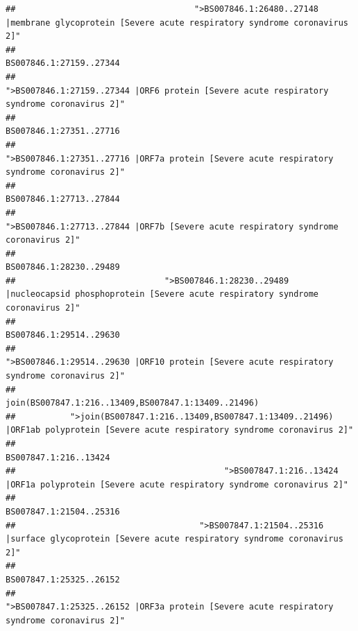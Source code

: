 \documentclass[
]{article}
\begin{document}
\begin{verbatim}
##                                    ">BS007846.1:26480..27148 |membrane glycoprotein [Severe acute respiratory syndrome coronavirus 2]" 
##                                                                                                                BS007846.1:27159..27344 
##                                             ">BS007846.1:27159..27344 |ORF6 protein [Severe acute respiratory syndrome coronavirus 2]" 
##                                                                                                                BS007846.1:27351..27716 
##                                            ">BS007846.1:27351..27716 |ORF7a protein [Severe acute respiratory syndrome coronavirus 2]" 
##                                                                                                                BS007846.1:27713..27844 
##                                                    ">BS007846.1:27713..27844 |ORF7b [Severe acute respiratory syndrome coronavirus 2]" 
##                                                                                                                BS007846.1:28230..29489 
##                              ">BS007846.1:28230..29489 |nucleocapsid phosphoprotein [Severe acute respiratory syndrome coronavirus 2]" 
##                                                                                                                BS007846.1:29514..29630 
##                                            ">BS007846.1:29514..29630 |ORF10 protein [Severe acute respiratory syndrome coronavirus 2]" 
##                                                                                    join(BS007847.1:216..13409,BS007847.1:13409..21496) 
##           ">join(BS007847.1:216..13409,BS007847.1:13409..21496) |ORF1ab polyprotein [Severe acute respiratory syndrome coronavirus 2]" 
##                                                                                                                  BS007847.1:216..13424 
##                                          ">BS007847.1:216..13424 |ORF1a polyprotein [Severe acute respiratory syndrome coronavirus 2]" 
##                                                                                                                BS007847.1:21504..25316 
##                                     ">BS007847.1:21504..25316 |surface glycoprotein [Severe acute respiratory syndrome coronavirus 2]" 
##                                                                                                                BS007847.1:25325..26152 
##                                            ">BS007847.1:25325..26152 |ORF3a protein [Severe acute respiratory syndrome coronavirus 2]" 

\end{verbatim}
\end{document}
